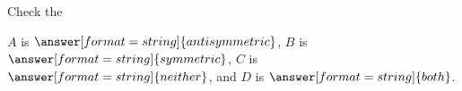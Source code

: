 \documentclass{ximera}
\begin{document}
\begin{problem}
  \begin{hint}
  
    Check the %

  \end{hint}
  
  $A$ is $\answer[format=string]{antisymmetric}$, $B$ is $\answer[format=string]{symmetric}$, $C$ is $\answer[format=string]{neither}$, and $D$ is $\answer[format=string]{both}$.
\end{problem}
\end{document}
